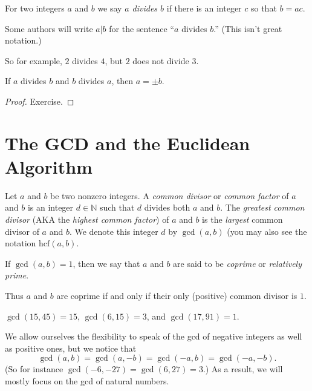 \documentclass[11pt,dvipsnames]{book}
\def\N{{\mathbb{N}}}
\numberwithin{figure}{section} %
\numberwithin{table}{section} %
\begin{document}
\begin{definition}
For two integers $a$ and $b$ we say {\it $a$ divides $b$} if there is an integer $c$ so that $b=ac$.

Some authors will write $a | b$ for the sentence ``$a$ divides $b$.''
(This isn't great notation.)
\end{definition}

\noindent So for example, $2$ divides $4$, but $2$ does not divide $3$.

\begin{lemma}
\label{l:abba}
If $a$ divides $b$ and $b$ divides $a$, then $a=\pm b$.
\end{lemma}

\begin{proof}
Exercise.
\end{proof}


\section{The GCD and the Euclidean Algorithm}%
\label{euclideanalgo}

\begin{definition}
Let $a$ and $b$ be two nonzero integers.
A \emph{common divisor} or \emph{common factor} of $a$ and $b$ is an integer $d \in \N$ such that $d$ divides both $a$ and $b$.
The {\it greatest common divisor} (AKA the {\it highest common factor}) of $a$ and $b$ is the \emph{largest} common divisor of $a$ and $b$.
We denote this integer $d$ by $\gcd(a,b)$ (you may also see the notation $\mathrm{hcf}(a,b)$.

If $\gcd(a,b)=1$, then we say that $a$ and $b$ are said to be {\it coprime} or {\it relatively prime}.
\end{definition}

Thus $a$ and $b$ are coprime if and only if their only (positive) common divisor is $1$.

\begin{example} $\gcd(15,45)=15$,
$\gcd(6,15)=3$, and $\gcd(17,91)=1$.
\end{example}

\begin{example}
We allow ourselves the flexibility to speak of the gcd of negative integers as well as positive ones, but we notice that
\[
\gcd(a,b) = \gcd(a,-b) = \gcd(-a,b) = \gcd(-a,-b).
\]
(So for instance $\gcd(-6,-27) = \gcd(6, 27) = 3$.)
As a result, we will mostly focus on the gcd of natural numbers.
\end{example}
\end{document}
